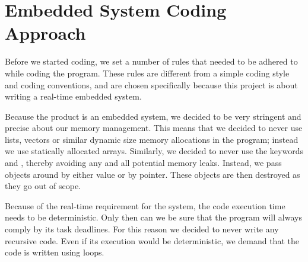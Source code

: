 \section{Embedded System Coding Approach}

Before we started coding, we set a number of rules that needed to be adhered to while coding the program. These rules are different from a simple coding style and coding conventions, and are chosen specifically because this project is about writing a real-time embedded system.

Because the product is an embedded system, we decided to be very stringent and precise about our memory management. This means that we decided to never use lists, vectors or similar dynamic size memory allocations in the program; instead we use statically allocated arrays. Similarly, we decided to never use the keywords  and , thereby avoiding any and all potential memory leaks. Instead, we pass objects around by either value or by pointer. These objects are then destroyed as they go out of scope. 

Because of the real-time requirement for the system, the code execution time needs to be deterministic. Only then can we be sure that the program will always comply by its task deadlines. For this reason we decided to never write any recursive code. Even if its execution would be deterministic, we demand that the code is written using loops. 

